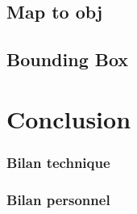 \documentclass[a4paper,12pt]{report}
\begin{document}
\section*{Map to obj}
\section*{Bounding Box}

\chapter{Conclusion}

\subsection*{Bilan technique}

\subsection*{Bilan personnel}
\end{document}

